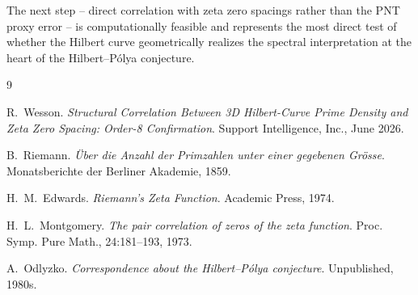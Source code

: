 \documentclass[11pt,a4paper]{article}
\begin{document}
The next step -- direct correlation with zeta zero spacings rather than
the PNT proxy error -- is computationally feasible and represents the
most direct test of whether the Hilbert curve geometrically realizes the
spectral interpretation at the heart of the Hilbert--P\'{o}lya conjecture.

\begin{thebibliography}{9}

R.~Wesson.
\emph{Structural Correlation Between 3D Hilbert-Curve Prime Density and
Zeta Zero Spacing: Order-8 Confirmation}.
Support Intelligence, Inc., June 2026.

B.~Riemann.
\emph{\"Uber die Anzahl der Primzahlen unter einer gegebenen Gr\"osse}.
Monatsberichte der Berliner Akademie, 1859.

H.~M.~Edwards.
\emph{Riemann's Zeta Function}.
Academic Press, 1974.

H.~L.~Montgomery.
\emph{The pair correlation of zeros of the zeta function}.
Proc. Symp. Pure Math., 24:181--193, 1973.

A.~Odlyzko.
\emph{Correspondence about the Hilbert--P\'{o}lya conjecture}.
Unpublished, 1980s.

\end{thebibliography}
\end{document}
